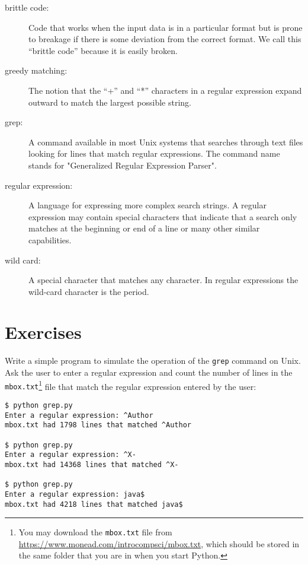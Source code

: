 \begin{description}

\item[brittle code:]
Code that works when the input data is in a particular format but is prone to breakage
if there is some deviation from the correct format.  We call this ``brittle code'' 
because it is easily broken.

\item[greedy matching:]
The notion that the ``+'' and ``*'' characters in a regular expression expand outward to
match the largest possible string.

\item[grep:]
A command available in most Unix systems that searches through text files looking for lines
that match regular expressions. The command name stands for "Generalized Regular Expression Parser".

\item[regular expression:]
A language for expressing more complex search strings.  A regular expression may contain
special characters that indicate that a search only matches at the beginning or end of a line
or many other similar capabilities.

\item[wild card:]
A special character that matches any character.  In regular expressions the wild-card
character is the period.

\end{description}

\section{Exercises}

\begin{ex}
Write a simple program to simulate the operation of the {\tt grep} command 
on Unix.  Ask the user to enter a regular expression and count the number
of lines in the {\tt mbox.txt}\footnote{You may download the \texttt{mbox.txt} file from \url{https://www.monead.com/introcompsci/mbox.txt}, which should be stored in the same folder that you are in when you start Python.} file that match the regular expression entered by the user:

\beforeverb
\begin{verbatim}
$ python grep.py
Enter a regular expression: ^Author
mbox.txt had 1798 lines that matched ^Author

$ python grep.py
Enter a regular expression: ^X-
mbox.txt had 14368 lines that matched ^X-

$ python grep.py
Enter a regular expression: java$
mbox.txt had 4218 lines that matched java$
\end{verbatim}
\afterverb
%
\end{ex}

